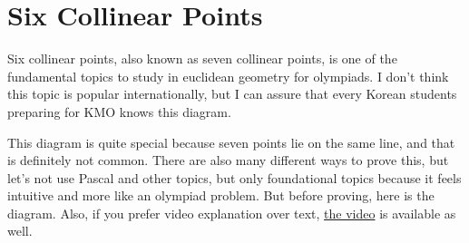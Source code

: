 \documentclass[../../../main.tex]{subfiles}
\begin{document}
\section{Six Collinear Points}

Six collinear points, also known as seven collinear points, is one of
the fundamental topics to study in euclidean geometry for olympiads.
I don't think this topic is popular internationally, but I can assure
that every Korean students preparing for KMO knows this diagram.

This diagram is quite special because seven points lie on the same
line, and that is definitely not common. There are also many different
ways to prove this, but let's not use Pascal and other topics,
but only foundational topics because it feels intuitive and more like
an olympiad problem. But before proving, here is the diagram.
Also, if you prefer video explanation over text,
\href{https://youtu.be/J0KrQFrODS8}{the video} is available as well.
\end{document}
